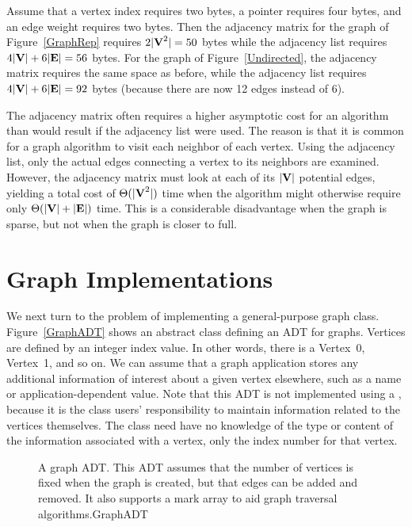 \begin{example}
Assume that a vertex index requires two bytes, a pointer requires
four bytes, and an edge weight requires two bytes.
Then the adjacency matrix for the graph of Figure~\ref{GraphRep}
requires \(2 |{\textbf{V}}^2| = 50\) bytes while the adjacency list requires
\(4 |{\textbf{V}}| + 6 |{\textbf{E}}| = 56\) bytes.
For the graph of Figure~\ref{Undirected}, the adjacency matrix
requires the same space as before, while the adjacency list requires
\(4 |{\textbf{V}}| + 6 |{\textbf{E}}| = 92\) bytes
(because there are now 12 edges instead of 6).
\end{example}

The adjacency matrix often requires a higher asymptotic cost for an
algorithm than would result if the adjacency list were used.
The reason is that it is common for a graph algorithm
to visit each neighbor of each vertex.
Using the adjacency list, only the actual edges connecting a vertex to
its neighbors are examined.
However, the adjacency matrix must look at each of its \(|{\textbf{V}}|\)
potential edges, yielding a total cost of \(\Theta(|{\textbf{V}}^2|)\)
time when the algorithm might otherwise require only
\(\Theta(|{\textbf{V}}| + |{\textbf{E}}|)\) time.
This is a considerable disadvantage when the graph is sparse,
but not when the graph is closer to full.

\section{Graph Implementations}
\label{GrImplSec}

We next turn to the problem of implementing a general-purpose graph
class.
Figure~\ref{GraphADT} shows an abstract class defining an ADT for
graphs.
Vertices are defined by an integer index value.
In other words, there is a Vertex~0, Vertex~1, and so on.
We can assume that a graph application stores any additional
information of interest about a given vertex elsewhere, such as a name
or application-dependent value.
Note that this ADT is not implemented using a \Gen,
because it is
the  class users' responsibility to maintain information
related to the vertices themselves.
The  class need have no knowledge of the type or content
of the information associated with a vertex, only the index number for
that vertex.

\begin{figure}
\vspace{-\smallskipamount}
{A graph ADT. This ADT assumes that the number of vertices is fixed
when the graph is created, but that edges can be added and removed.
It also supports a mark array to aid graph traversal algorithms.}{GraphADT}
\vspace{\smallskipamount}
\end{figure}

